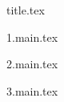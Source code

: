 \documentclass[a4paper,11pt]{book}
\begin{document}
{
	\frontmatter
	{title.tex}
	
	\thispagestyle{empty}

	\tableofcontents
	
	\mainmatter
	{1.main.tex}
	
	{2.main.tex}
	
	{3.main.tex}
}
\end{document}
